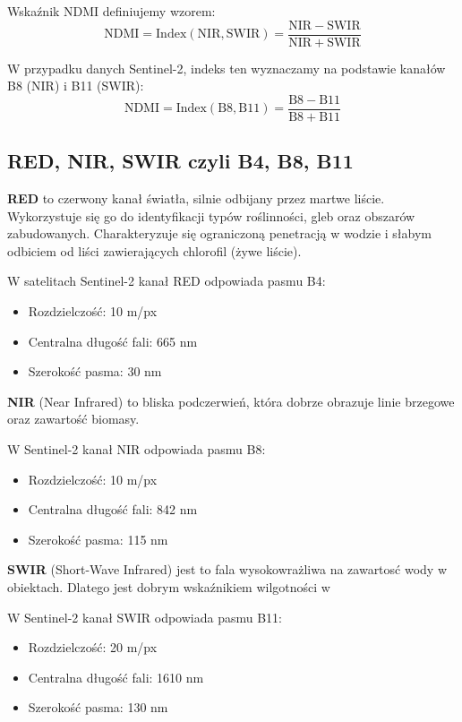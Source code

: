 \documentclass[12pt,a4paper]{article}
\begin{document}
Wskaźnik NDMI definiujemy wzorem:
\[
\mathrm{NDMI} = \mathrm{Index}(\mathrm{NIR}, \mathrm{SWIR}) = \frac{\mathrm{NIR} - \mathrm{SWIR}}{\mathrm{NIR} + \mathrm{SWIR}}
\]

W przypadku danych Sentinel-2, indeks ten wyznaczamy na podstawie kanałów B8 (NIR) i B11 (SWIR):
\[
\mathrm{NDMI} = \mathrm{Index}(\mathrm{B8}, \mathrm{B11}) = \frac{\mathrm{B8} - \mathrm{B11}}{\mathrm{B8} + \mathrm{B11}}
\]

\subsection{RED, NIR, SWIR czyli B4, B8, B11}

\textbf{RED} to czerwony kanał światła, silnie odbijany przez martwe liście. Wykorzystuje się go do identyfikacji typów roślinności, gleb oraz obszarów zabudowanych. Charakteryzuje się ograniczoną penetracją w wodzie i słabym odbiciem od liści zawierających chlorofil (żywe liście).

W satelitach Sentinel-2 kanał RED odpowiada pasmu B4: \cite{sentinel2_band_B4}
\begin{itemize}
    \item Rozdzielczość: 10 m/px
    \item Centralna długość fali: 665 nm
    \item Szerokość pasma: 30 nm
\end{itemize}

\textbf{NIR} (Near Infrared) to bliska podczerwień, która dobrze obrazuje linie brzegowe oraz zawartość biomasy.

W Sentinel-2 kanał NIR odpowiada pasmu B8: \cite{sentinel2_band_B8}
\begin{itemize}
    \item Rozdzielczość: 10 m/px
    \item Centralna długość fali: 842 nm
    \item Szerokość pasma: 115 nm
\end{itemize}

\textbf{SWIR} (Short-Wave Infrared) jest to fala wysokowrażliwa na zawartosć wody w obiektach. Dlatego jest dobrym wskaźnikiem wilgotności w 

W Sentinel-2 kanał SWIR odpowiada pasmu B11: \cite{sentinel2_band_B11}
\begin{itemize}
    \item Rozdzielczość: 20 m/px
    \item Centralna długość fali: 1610 nm
    \item Szerokość pasma: 130 nm
\end{itemize}
\end{document}

